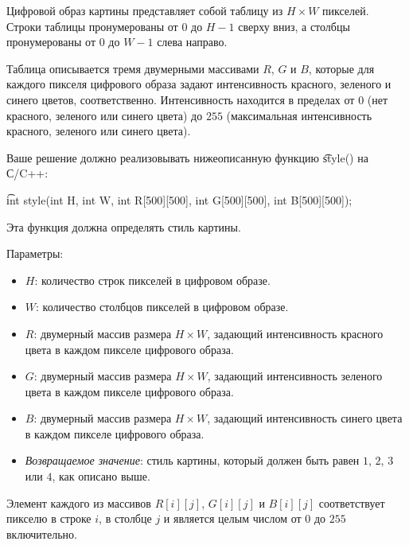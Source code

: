 Цифровой образ картины представляет собой таблицу из $H \times W$ пикселей. Строки
таблицы пронумерованы от $0$ до $H ­- 1$ сверху вниз, а столбцы пронумерованы от
$0$ до $W -­ 1$ слева направо.

Таблица описывается тремя двумерными массивами $R$, $G$ и $B$, которые для
каждого пикселя цифрового образа задают интенсивность красного, зеленого и
синего цветов, соответственно. Интенсивность находится в пределах от $0$ (нет
красного, зеленого или синего цвета) до $255$ (максимальная интенсивность
красного, зеленого или синего цвета).

Ваше решение должно реализовывать нижеописанную функцию \t{style()} на С/C++:

\t{int style(int H, int W, int R[500][500], int G[500][500], int B[500][500]);}


Эта функция должна определять стиль картины.

Параметры:
\begin{itemize}
\item $H$: количество строк пикселей в цифровом образе.
\item $W$: количество столбцов пикселей в цифровом образе.
\item $R$: двумерный массив размера $H \times W$, задающий интенсивность красного цвета в каждом пикселе цифрового образа.
\item $G$: двумерный массив размера $H \times W$, задающий интенсивность зеленого цвета в каждом пикселе цифрового образа.
\item $B$: двумерный массив размера $H \times W$, задающий интенсивность синего цвета в каждом пикселе цифрового образа.
\item \textit{Возвращаемое значение}: стиль картины, который должен быть равен $1$, $2$, $3$ или $4$, как описано выше.
\end{itemize}

Элемент каждого из массивов $R[i][j]$, $G[i][j]$ и $B[i][j]$ соответствует
пикселю в строке $i$, в столбце $j$ и является целым числом от $0$ до $255$
включительно.